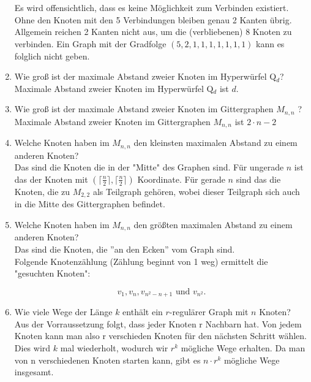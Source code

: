 \begin{enumerate}[label=(\alph*)]
\\\\
        Es wird offensichtlich, dass es keine Möglichkeit zum Verbinden existiert. Ohne den Knoten mit 
        den 5 Verbindungen bleiben genau 2 Kanten übrig. Allgemein reichen 2 Kanten  nicht aus, um die 
        (verbliebenen) 8 Knoten zu verbinden. Ein Graph mit der Gradfolge $(5,2,1,1,1,1,1,1,1)$ kann es 
        folglich nicht geben. 
         
        \item Wie groß ist der maximale Abstand zweier Knoten im Hyperwürfel Q$_d$? \\
        Maximale Abstand zweier Knoten im Hyperwürfel Q$_d$ ist $d$.
        
        \item Wie groß ist der maximale Abstand zweier Knoten im Gittergraphen $M_{n,n}$ ? \\
        Maximale Abstand zweier Knoten im Gittergraphen $M_{n,n}$ ist $2\cdot n - 2$
        
        \item Welche Knoten haben im $M_{n,n}$ den kleinsten maximalen Abstand zu einem anderen Knoten? \\
        Das sind die Knoten die in der "Mitte" des Graphen sind. Für ungerade $n$ ist das der Knoten mit
        $(\big\lceil\frac{n}{2}\big\rceil,\big\lceil\frac{n}{2}\big\rceil)$ Koordinate. 
        Für gerade $n$ sind das die Knoten, die zu $M_{2,2}$ als Teilgraph gehören, wobei dieser Teilgraph sich auch in die Mitte des Gittergraphen befindet.
        
        \item Welche Knoten haben im $M_{n,n}$ den größten maximalen Abstand zu einem anderen Knoten? \\
        Das sind die Knoten, die ''an den Ecken'' vom Graph sind. \\
        Folgende Knotenzählung (Zählung beginnt von 1 weg) ermittelt die "gesuchten Knoten":
        
        $$v_1, v_n, v_{n^2-n+1} \text{ und } v_{n^2}.$$
        
        \item Wie viele Wege der Länge $k$ enthält ein $r$-regulärer Graph mit $n$ Knoten? \\
        Aus der Vorraussetzung folgt, dass jeder Knoten r Nachbarn hat. Von jedem Knoten kann man also r verschieden Knoten für den nächsten Schritt wählen. Dies wird $k$ mal wiederholt, wodurch wir $r^k$ mögliche Wege erhalten. Da man von n verschiedenen Knoten starten kann, gibt es $n \cdot r^k$ mögliche Wege insgesamt.
        

\end{enumerate}
